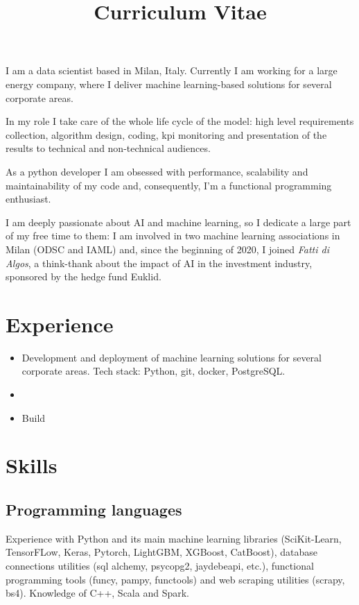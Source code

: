 \documentclass[11pt,a4paper,sans]{moderncv}        %
\title{Curriculum Vitae}                               %
\begin{document}
\makecvtitle
\small{I am a data scientist based in Milan, Italy. Currently I am working for a large energy company, where I deliver machine learning-based solutions for several corporate areas.

In my role I take care of the whole life cycle of the model: high level requirements collection, algorithm design, coding, kpi monitoring and presentation of the results to technical and non-technical audiences. 

As a python developer I am obsessed with performance, scalability and maintainability of my code and, consequently, I'm a functional programming enthusiast. 

I am deeply passionate about AI and machine learning, so I dedicate a large part of my free time to them: I am involved in two machine learning associations in Milan (ODSC and IAML) and, since the beginning of 2020, I joined \emph{Fatti di Algos}, a think-thank about the impact of AI in the investment industry, sponsored by the hedge fund Euklid.}

\section{Experience}

\begin{itemize}
\item{
Development and deployment of machine learning solutions for several corporate areas. Tech stack: Python, git, docker, PostgreSQL.}
\item{}
\item{
Build}
\end{itemize}

\section{Skills}
\subsection{Programming languages}
Experience with Python and its main machine learning libraries (SciKit-Learn, TensorFLow, Keras, Pytorch, LightGBM, XGBoost, CatBoost), database connections utilities (sql alchemy, psycopg2, jaydebeapi, etc.), functional programming tools (funcy, pampy, functools) and web scraping utilities (scrapy, bs4). Knowledge of C++, Scala and Spark.
\end{document}
